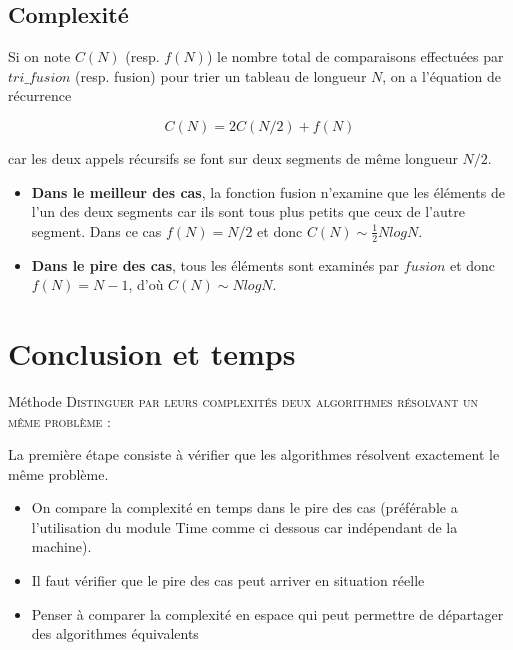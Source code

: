 \begin{exemple2}

\ifprof
\begin{center}
		
\end{center}
\fi

\end{exemple2}



\subsection{Complexité \cite{wack}}


Si on note $C(N)$ (resp. $f(N)$) le nombre total de comparaisons effectuées par $tri\_fusion$
(resp. fusion) pour trier un tableau de longueur $N$, on a l'équation de récurrence

$$C(N) = 2C(N/2) + f(N)$$

car les deux appels récursifs se font sur deux segments de même longueur $N/2$. 

\begin{itemize}
\item \textbf{Dans le meilleur des cas}, la fonction fusion n'examine que les éléments de l'un des deux segments
car ils sont tous plus petits que ceux de l'autre segment. Dans ce cas $f(N) = N/2$ et donc
$C(N) \sim \frac{1}{2} N log N$. 

\item \textbf{Dans le pire des cas}, tous les éléments sont examinés par $fusion$ et
donc $f(N) = N-1$, d'où $C(N) \sim N logN$.
\end{itemize}


\section{Conclusion et temps}

\begin{prop}{Méthode}
\textsc{Distinguer par leurs complexités deux algorithmes résolvant
un même problème :}

La première étape consiste à vérifier que les algorithmes résolvent exactement le même problème.

\begin{itemize}
\item On compare la complexité en temps dans le pire des cas (préférable a l'utilisation du module Time comme ci dessous car indépendant de la machine).
\item Il faut vérifier que le pire des cas peut arriver en situation réelle
\item Penser à comparer la complexité en espace qui peut permettre de départager des algorithmes équivalents
\end{itemize}
\end{prop}

